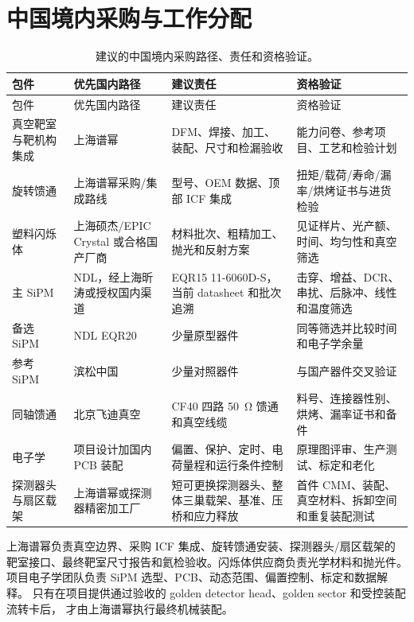 \documentclass[UTF8,10pt,letterpaper,fontset=none]{ctexart}
\begin{document}
\section{中国境内采购与工作分配}

\begin{longtable}{L{0.17\textwidth}L{0.22\textwidth}L{0.31\textwidth}L{0.22\textwidth}}
  \caption{建议的中国境内采购路径、责任和资格验证。}\\
  \toprule
  包件 & 优先国内路径 & 建议责任 & 资格验证 \\
  \midrule
  \endfirsthead
  \toprule
  包件 & 优先国内路径 & 建议责任 & 资格验证 \\
  \midrule
  \endhead
  真空靶室与靶机构集成 & 上海谱幂 &
    DFM、焊接、加工、装配、尺寸和检漏验收 &
    能力问卷、参考项目、工艺和检验计划 \\
  旋转馈通 & 上海谱幂采购/集成路线 &
    型号、OEM 数据、顶部 ICF 集成 &
    扭矩/载荷/寿命/漏率/烘烤证书与进货检验 \\
  塑料闪烁体 & 上海硕杰/EPIC Crystal 或合格国产厂商 &
    材料批次、粗精加工、抛光和反射方案 &
    见证样片、光产额、时间、均匀性和真空筛选 \\
  主 SiPM & NDL，经上海昕涛或授权国内渠道 &
    EQR15 11-6060D-S，当前 datasheet 和批次追溯 &
    击穿、增益、DCR、串扰、后脉冲、线性和温度筛选 \\
  备选 SiPM & NDL EQR20 &
    少量原型器件 & 同等筛选并比较时间和电子学余量 \\
  参考 SiPM & 滨松中国 & 少量对照器件 & 与国产器件交叉验证 \\
  同轴馈通 & 北京飞迪真空 &
    CF40 四路 \SI{50}{\ohm} 馈通和真空线缆 &
    料号、连接器性别、烘烤、漏率证书和备件 \\
  电子学 & 项目设计加国内 PCB 装配 &
    偏置、保护、定时、电荷量程和运行条件控制 &
    原理图评审、生产测试、标定和老化 \\
  探测器头与扇区载架 & 上海谱幂或探测器精密加工厂 &
    短可更换探测器头、整体三巢载架、基准、压桥和应力释放 &
    首件 CMM、装配、真空材料、拆卸空间和重复装配测试 \\
  \bottomrule
\end{longtable}

上海谱幂负责真空边界、采购 ICF 集成、旋转馈通安装、探测器头/扇区载架的
靶室接口、最终靶室尺寸报告和氦检验收。闪烁体供应商负责光学材料和抛光件。
项目电子学团队负责 SiPM 选型、PCB、动态范围、偏置控制、标定和数据解释。
只有在项目提供通过验收的 golden detector head、golden sector 和受控装配流转卡后，
才由上海谱幂执行最终机械装配。
\end{document}
